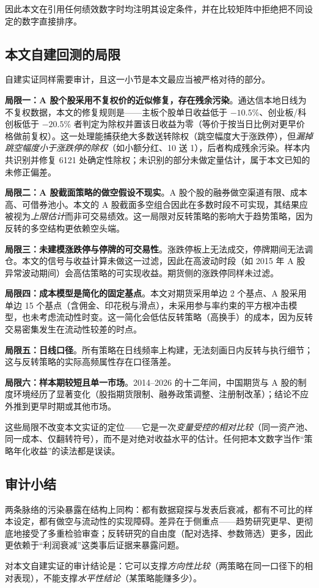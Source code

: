 因此本文在引用任何绩效数字时均注明其设定条件，并在比较矩阵中拒绝把不同设定的数字直接排序。

\subsection{本文自建回测的局限}\label{sec:selfaudit}

自建实证同样需要审计，且这一小节是本文最应当被严格对待的部分。

\textbf{局限一：A 股个股采用不复权价的近似修复，存在残余污染}。通达信本地日线为不复权数据，本文的修复规则是——主板个股单日收益低于 $-10.5\%$、创业板/科创板低于 $-20.5\%$ 者判定为除权并置该日收益为零（等价于按当日比例对更早价格做前复权）。这一处理能捕获绝大多数送转除权（跳空幅度大于涨跌停），但\emph{漏掉跳空幅度小于涨跌停的除权}（如小额分红、10 送 1），后者构成残余污染。样本内共识别并修复 6121 处确定性除权；未识别的部分未做定量估计，属于本文已知的未修正偏差。

\textbf{局限二：A 股截面策略的做空假设不现实}。A 股个股的融券做空渠道有限、成本高、可借券池小。本文的 A 股截面多空组合因此在多数时段不可实现，其结果应被视为\emph{上限估计}而非可交易绩效。这一局限对反转策略的影响大于趋势策略，因为反转的多空结构更依赖空头端。

\textbf{局限三：未建模涨跌停与停牌的可交易性}。涨跌停板上无法成交，停牌期间无法调仓。本文的信号与收益计算未做这一过滤，因此在高波动时段（如 2015 年 A 股异常波动期间）会高估策略的可实现收益。期货侧的涨跌停同样未过滤。

\textbf{局限四：成本模型是简化的固定基点}。本文对期货采用单边 2 个基点、A 股采用单边 15 个基点（含佣金、印花税与滑点），未采用参与率约束的平方根冲击模型，也未考虑流动性时变。这一简化会低估反转策略（高换手）的成本，因为反转交易密集发生在流动性较差的时点。

\textbf{局限五：日线口径}。所有策略在日线频率上构建，无法刻画日内反转与执行细节；这与反转策略的实际高频属性存在口径落差。

\textbf{局限六：样本期较短且单一市场}。2014--2026 的十二年间，中国期货与 A 股的制度环境经历了显著变化（股指期货限制、融券政策调整、注册制改革）；结论不应外推到更早时期或其他市场。

这些局限不改变本文实证的定位——它是一次\emph{变量受控的相对比较}（同一资产池、同一成本、仅翻转符号），而不是对绝对收益水平的估计。任何把本文数字当作“策略年化收益”的读法都是误读。

\subsection{审计小结}

两条脉络的污染暴露在结构上同构：都有数据窥探与发表后衰减，都有不可比的样本设定，都有做空与流动性的实现障碍。差异在于侧重点——趋势研究更早、更彻底地接受了多重检验审查；反转研究的自由度（配对选择、参数筛选）更多，因此更依赖于“利润衰减”这类事后证据来暴露问题。

对本文自建实证的审计结论是：它可以支撑\emph{方向性比较}（两策略在同一口径下的相对表现），不能支撑\emph{水平性结论}（某策略能赚多少）。
